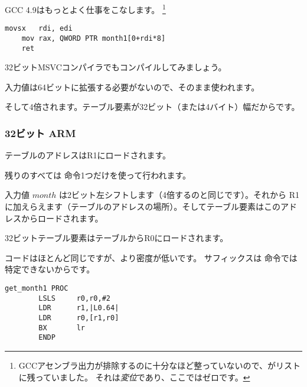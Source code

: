 \Optimizing GCC 4.9はもっとよく仕事をこなします。
\footnote{GCCアセンブラ出力が排除するのに十分なほど整っていないので、がリストに残っていました。 
それは\emph{変位}であり、ここではゼロです。}

\begin{lstlisting}[caption=\Optimizing GCC 4.9 x64,style=customasmx86]
	movsx	rdi, edi
	mov	rax, QWORD PTR month1[0+rdi*8]
	ret
\end{lstlisting}


32ビットMSVCコンパイラでもコンパイルしてみましょう。



入力値は64ビットに拡張する必要がないので、そのまま使われます。

そして4倍されます。テーブル要素が32ビット（または4バイト）幅だからです。

\subsubsection{32ビット ARM}





テーブルのアドレスはR1にロードされます。

残りのすべては \LDR 命令1つだけを使って行われます。

入力値 $month$ は2ビット左シフトします（4倍するのと同じです）。それから
R1に加えらえます（テーブルのアドレスの場所）。そしてテーブル要素はこのアドレスからロードされます。

32ビットテーブル要素はテーブルからR0にロードされます。


コードはほとんど同じですが、より密度が低いです。 \LSL サフィックスは \LDR 命令では特定できないからです。

\begin{lstlisting}[style=customasmARM]
get_month1 PROC
        LSLS     r0,r0,#2
        LDR      r1,|L0.64|
        LDR      r0,[r1,r0]
        BX       lr
        ENDP
\end{lstlisting}

